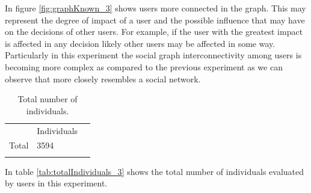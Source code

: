 In figure \ref{fig:graphKnown_3} shows users more connected in the graph. This
may represent the degree of impact of a user and the possible influence that may
have on the decisions of other users. For example, if the user with the greatest
impact is affected in any decision likely other users may be affected in some
way. Particularly in this experiment the social graph interconnectivity among
users is becoming more complex as compared to the previous experiment as we can
observe that more closely resembles a social network.


\begin{table}
\small
\caption{Total number of individuals.}
\label{tab:totalIndividuals_33}
\centering
\small
\begin{tabular}{p{3cm} p{3cm} p{3cm} }
\hline\noalign{\smallskip}
  & Individuals &  \\
\noalign{\smallskip}\hline\noalign{\smallskip}
\small{Total } & \small{3594} & \\ \hline
\noalign{\smallskip}\hline
\end{tabular}
\end{table}

In table \ref{tab:totalIndividuals_3} shows the total number of individuals
evaluated by users in this experiment.

